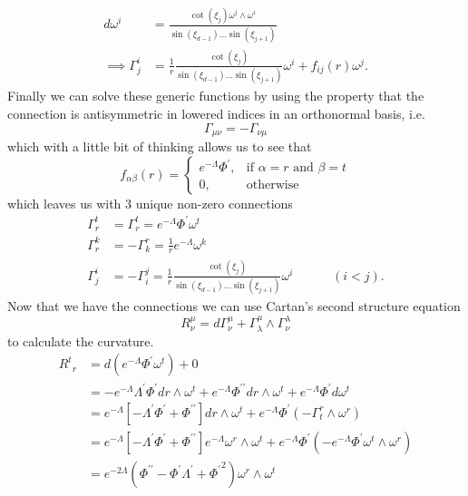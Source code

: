 \documentclass[12pt]{article}
\numberwithin{equation}{section}
\numberwithin{figure}{section}
\begin{document}
\begin{align}
	d\omega^{i}&=\frac{\cot(\xi_j)\omega^{j}\wedge\omega^{i}}{\sin(\xi_{d-1})\dots\sin(\xi_{j+1})}\\
	\implies \Gamma^{i}_{j} &= \frac{1}{r}\frac{\cot(\xi_j)}{\sin(\xi_{d-1})\dots\sin(\xi_{j+1})}\omega^{i} + f_{ij}(r)\omega^{j}.
\end{align}
Finally we can solve these generic functions by using the property that the connection is antisymmetric in lowered indices in an orthonormal basis, i.e.
\begin{equation}
	\Gamma_{\mu\nu}=-\Gamma_{\nu\mu}
\end{equation}
which with a little bit of thinking allows us to see that
\begin{equation}
	f_{\alpha\beta}(r)=
	\begin{cases}
		e^{-\Lambda}\Phi^{\prime}, &\text{if } \alpha=r \text{ and } \beta=t\\
		0, 	&\text{otherwise}
	\end{cases}
\end{equation}
which leaves us with 3 unique non-zero connections
\begin{align}
\Gamma^{t}_{r}&=\Gamma^{t}_{r}=	e^{-\Lambda}\Phi^{\prime} \omega^{t}\\
\Gamma^{k}_{r}&=-\Gamma^{r}_{k}=	\frac{1}{r}e^{-\Lambda}\omega^{k}\\
\Gamma^{i}_{j}&=-\Gamma^{j}_{i}=	\frac{1}{r}\frac{\cot(\xi_j)}{\sin(\xi_{d-1})\dots\sin(\xi_{j+1})}\omega^{i} \;\;\;\;\;\;\;\;\;\;\;(i<j).
\end{align}
Now that we have the connections we can use Cartan's second structure equation
\begin{equation}
	R^{\mu}_{\nu}=d \Gamma^{\mu}_{\nu}+\Gamma^{\mu}_{\lambda}\wedge \Gamma^{\lambda}_{\nu}
\end{equation}
to calculate the curvature.
\begin{align}
{R^{t}}_{r} &= d(e^{-\Lambda}\Phi^{\prime}\omega^{t}) + 0\\
			&= -e^{-\Lambda} \Lambda ^{\prime} \Phi ^{\prime} dr \wedge \omega^{t} + e^{-\Lambda}\Phi ^{\prime\prime}  dr \wedge \omega^{t} +e^{-\Lambda} \Phi ^{\prime} d\omega^{t}\\
			&=e^{-\Lambda}\left[ -\Lambda ^{\prime} \Phi ^{\prime} + \Phi ^{\prime\prime}\right]dr \wedge \omega^{t} + e^{-\Lambda}\Phi ^{\prime} (-\Gamma^{r}_{t}\wedge \omega^{r})\\
			&=e^{-\Lambda}\left[ -\Lambda ^{\prime} \Phi ^{\prime} + \Phi ^{\prime\prime}\right]e^{-\Lambda} \omega^{r}\wedge \omega^{t} +e^{-\Lambda}\Phi ^{\prime}  (-e^{-\Lambda}\Phi ^{\prime} \omega^{t}\wedge \omega^{r})\\
			&=e^{-2\Lambda}\left(\Phi ^{\prime\prime} - \Phi ^{\prime} \Lambda ^{\prime} +{\Phi ^{\prime}}^2\right) \omega^{r}\wedge \omega^{t}
\end{align}
\end{document}

